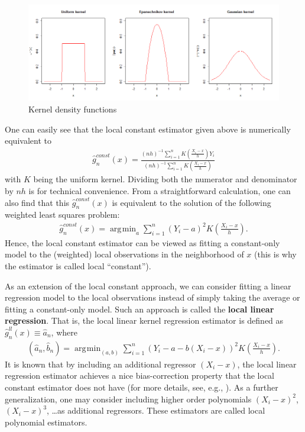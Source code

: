 \documentclass[10.5pt, A4paper, openany, uplatex]{book}
\renewcommand{\hat}{\widehat}
\numberwithin{equation}{section}
\DeclareMathOperator*{\argmin}{\arg\!\min}
\begin{document}
\begin{figure}[h!]
	\begin{center}
		\includegraphics[width = 15cm]{kernels.png}
		\caption{Kernel density functions}\label{fig:kernels}
	\end{center}
\end{figure}

One can easily see that the local constant estimator given above is numerically equivalent to
\begin{align*}
	\hat g^{const}_n(x) = \frac{(nh)^{-1}\sum_{i = 1}^n K\left( \frac{X_i - x}{h}\right) Y_i}{(nh)^{-1}\sum_{i = 1}^n K\left( \frac{X_i - x}{h}\right)}
\end{align*}
with $K$ being the uniform kernel.
Dividing both the numerator and denominator by $nh$ is for technical convenience.
From a straightforward calculation, one can also find that this $\hat g^{const}_n(x)$ is equivalent to the solution of the following weighted least squares problem:
\begin{align*}
	\hat g^{const}_n(x) = \argmin_a \sum_{i = 1}^n (Y_i - a)^2K\left( \frac{X_i - x}{h}\right).
\end{align*}
Hence, the local constant estimator can be viewed as fitting a constant-only model to the (weighted) local observations in the neighborhood of $x$ (this is why the estimator is called local ``constant'').

As an extension of the local constant approach, we can consider fitting a linear regression model to the local observations instead of simply taking the average or fitting a constant-only model.
Such an approach is called the \textbf{local linear regression}.
That is, the local linear kernel regression estimator is defined as $\hat g^{ll}_n(x) \equiv \hat a_n$, where
\begin{align*}
	(\hat a_n, \hat b_n) = \argmin_{(a, b)} \sum_{i = 1}^n (Y_i - a - b (X_i -x))^2K\left( \frac{X_i - x}{h}\right).
\end{align*}
It is known that by including an additional regressor $(X_i - x)$, the local linear regression estimator achieves a nice bias-correction property that the local constant estimator does not have (for more details, see, e.g., \cite{li2007nonparametric}).
As a further generalization, one may consider including higher order polynomials $(X_i - x)^2$, $(X_i - x)^3$, \ldots as additional regressors.
These estimators are called local polynomial estimators.
\end{document}

